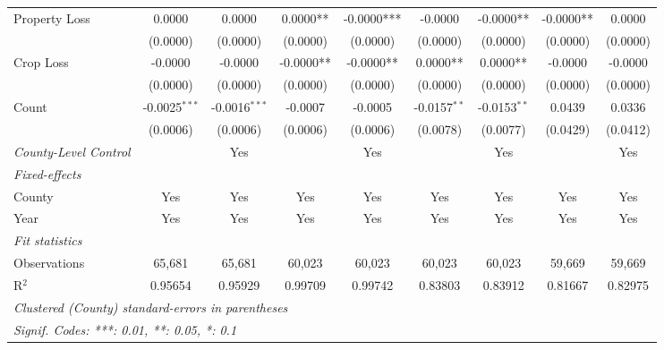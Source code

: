 \documentclass[letterpaper]{article}
\begin{document}
\begin{table}[H]
\begin{tabular}{lcccccccc}
   Property Loss            & 0.0000    & 0.0000         & 0.0000**  & -0.0000***  & -0.0000       & -0.0000**  & -0.0000**  & 0.0000\\    
                   & (0.0000)  & (0.0000)       & (0.0000)       & (0.0000)         & (0.0000)      & (0.0000)        & (0.0000)        & (0.0000)\\    
   Crop Loss           & -0.0000       & -0.0000         & -0.0000**  & -0.0000**    & 0.0000**  & 0.0000**    & -0.0000        & -0.0000\\    
                   & (0.0000)   & (0.0000)        & (0.0000)        & (0.0000)          & (0.0000)       & (0.0000)         & (0.0000)        & (0.0000)\\    
   Count           & -0.0025$^{***}$          & -0.0016$^{***}$               & -0.0007                       & -0.0005                         & -0.0157$^{**}$               & -0.0153$^{**}$                 & 0.0439                        & 0.0336\\   
                   & (0.0006)                 & (0.0006)                      & (0.0006)                      & (0.0006)                        & (0.0078)                     & (0.0077)                       & (0.0429)                      & (0.0412)\\   
  \midrule                
   \emph{County-Level Control }          &                     & Yes                    &                     & Yes                     &           & Yes             &                      & Yes\\ 
   \midrule
   \emph{Fixed-effects}\\
   County          & Yes                      & Yes                           & Yes                           & Yes                             & Yes                          & Yes                            & Yes                           & Yes\\  
   Year            & Yes                      & Yes                           & Yes                           & Yes                             & Yes                          & Yes                            & Yes                           & Yes\\  
   \midrule
   \emph{Fit statistics}\\
   Observations    & 65,681                   & 65,681                        & 60,023                        & 60,023                          & 60,023                       & 60,023                         & 59,669                        & 59,669\\  
   R$^2$           & 0.95654                  & 0.95929                       & 0.99709                       & 0.99742                         & 0.83803                      & 0.83912                        & 0.81667                       & 0.82975\\  
   \midrule \midrule
   \multicolumn{9}{l}{\emph{Clustered (County) standard-errors in parentheses}}\\
   \multicolumn{9}{l}{\emph{Signif. Codes: ***: 0.01, **: 0.05, *: 0.1}}\\
\end{tabular}
\end{table}
\end{document}
